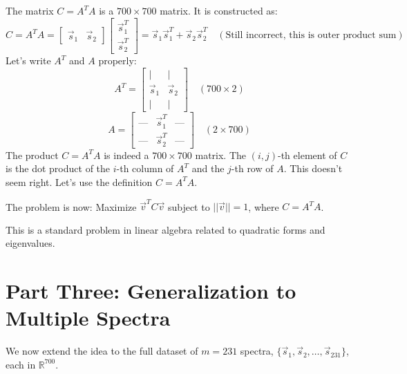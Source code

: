 \documentclass{report}
\begin{document}
The matrix $C = A^T A$ is a $700 \times 700$ matrix. It is constructed as:
\[
	C = A^T A = \begin{bmatrix} \vec{s}_1 & \vec{s}_2 \end{bmatrix} \begin{bmatrix} \vec{s}_1^T \\ \vec{s}_2^T \end{bmatrix} = \vec{s}_1 \vec{s}_1^T + \vec{s}_2 \vec{s}_2^T \quad (\text{Still incorrect, this is outer product sum})
\]
Let's write $A^T$ and $A$ properly:
\[
	A^T = \begin{bmatrix} | & | \\ \vec{s}_1 & \vec{s}_2 \\ | & | \end{bmatrix} \quad (700 \times 2)
\]
\[
	A = \begin{bmatrix} \text{---} & \vec{s}_1^T & \text{---} \\ \text{---} & \vec{s}_2^T & \text{---} \end{bmatrix} \quad (2 \times 700)
\]
The product $C = A^T A$ is indeed a $700 \times 700$ matrix. The $(i, j)$-th element of $C$ is the dot product of the $i$-th column of $A^T$ and the $j$-th row of $A$. This doesn't seem right. Let's use the definition $C = A^T A$.

The problem is now:
Maximize $\vec{v}^T C \vec{v}$ subject to $||\vec{v}|| = 1$, where $C = A^T A$.

This is a standard problem in linear algebra related to quadratic forms and eigenvalues.

\section{Part Three: Generalization to Multiple Spectra}

We now extend the idea to the full dataset of $m=231$ spectra, $\{\vec{s}_1, \vec{s}_2, \dots, \vec{s}_{231}\}$, each in $\mathbb{R}^{700}$.

\end{document}
